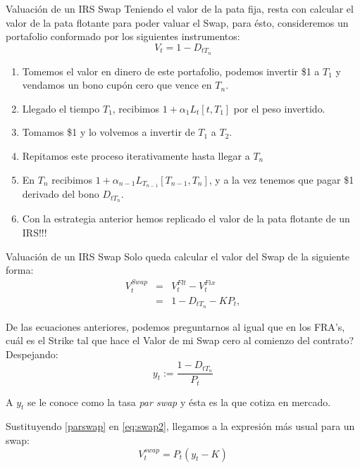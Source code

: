 \documentclass[11pt]{beamer}
\begin{document}
\begin{frame}{Valuación de un IRS Swap}
		Teniendo el valor de la pata fija, resta con calcular el valor de la pata flotante para poder valuar el Swap, para ésto, consideremos un portafolio conformado por los siguientes instrumentos:
	\begin{equation}\label{eq:swap}
	V_t=1-D_{t T_n}
	\end{equation}
	
	
	\begin{enumerate}
		\item Tomemos el valor en dinero de este portafolio, podemos invertir \$1 a $T_1$ y vendamos un bono cupón cero que vence en $T_n$.
		\item Llegado el tiempo $T_1$, recibimos  $1+\alpha_1 L_{t}[t,T_1] $ por el peso invertido.
		\item Tomamos \$1 y lo volvemos a invertir de $T_1$ a $T_2$.
		\item Repitamos este proceso iterativamente hasta llegar a $T_n$
		\item En $T_n$ recibimos $1+\alpha_{n-1} L_{T_{n-1}}[T_{n-1},T_{n}] $, y a la vez tenemos que pagar \$1 derivado del bono $D_{tT_n}$.
		\item Con la estrategia anterior hemos replicado el valor de la pata flotante de un IRS!!!
	\end{enumerate}
\end{frame}

\begin{frame}{Valuación de un IRS Swap}
Solo queda calcular el valor del Swap de la siguiente forma:
\begin{eqnarray}\label{eq:swap2}
V_t^{Swap}&=&V_t^{Flt}-V_t^{Fix}\\
		  &=&1-D_{tT_n}-KP_t,
\end{eqnarray}

De las ecuaciones anteriores, podemos preguntarnos al igual que en los FRA's, cuál es el Strike tal que hace el Valor de mi Swap cero al comienzo del contrato? Despejando:
\begin{equation}\label{parswap}
y_t:=\frac{1-D_{tT_n}}{P_t}
\end{equation}

A $y_t$ se le conoce como la tasa \textit{par swap} y ésta es la que cotiza en mercado.

Sustituyendo \eqref{parswap} en \eqref{eq:swap2}, llegamos a la expresión más usual para un swap:
\begin{equation}
V_t^{swap}=P_t(y_t-K)
\end{equation}
\end{frame}
\end{document}
